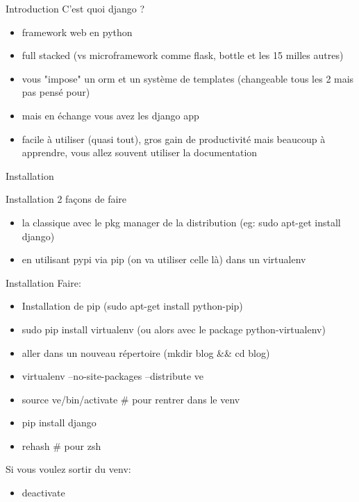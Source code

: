 \documentclass{beamer}
\begin{document}
\begin{frame}{Introduction}
    \vspace{3mm}
    C'est quoi django ?
    \begin{itemize}
        \item framework web en python\pause
        \item full stacked (vs microframework comme flask, bottle et les 15 milles autres)\pause
        \item vous "impose" un orm et un système de templates (changeable tous les 2 mais pas pensé pour)\pause
        \item mais en échange vous avez les django app\pause
        \item facile à utiliser (quasi tout), gros gain de productivité mais beaucoup à apprendre, vous allez souvent utiliser la documentation
    \end{itemize}
\end{frame}

\begin{frame}[fragile]{}
\begin{LARGE}
\begin{center}
Installation
\end{center}
\end{LARGE}
\end{frame}

\begin{frame}{Installation}
2 façons de faire
\begin{itemize}
    \item la classique avec le pkg manager de la distribution (eg: sudo apt-get install django)
    \item en utilisant pypi via pip (on va utiliser celle là) dans un virtualenv
\end{itemize}
\end{frame}

\begin{frame}{Installation}
    Faire:
    \begin{itemize}
        \item Installation de pip (sudo apt-get install python-pip)\pause
        \item sudo pip install virtualenv (ou alors avec le package python-virtualenv)\pause
        \item aller dans un nouveau répertoire (mkdir blog \&\& cd blog)\pause
        \item virtualenv --no-site-packages --distribute ve\pause
        \item source ve/bin/activate \# pour rentrer dans le venv\pause
        \item pip install django\pause
        \item rehash \# pour zsh
    \end{itemize}
    \vspace{3mm}
    \pause
    Si vous voulez sortir du venv:
    \begin{itemize}
        \item deactivate
    \end{itemize}
\end{frame}
\end{document}
